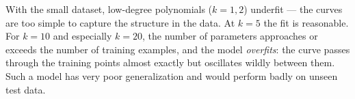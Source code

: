 \begin{answer}
With the small dataset, low-degree polynomials ($k=1,2$) underfit — the curves are too simple to capture the structure in the data. At $k=5$ the fit is reasonable. For $k=10$ and especially $k=20$, the number of parameters approaches or exceeds the number of training examples, and the model \emph{overfits}: the curve passes through the training points almost exactly but oscillates wildly between them. Such a model has very poor generalization and would perform badly on unseen test data.
\end{answer}
